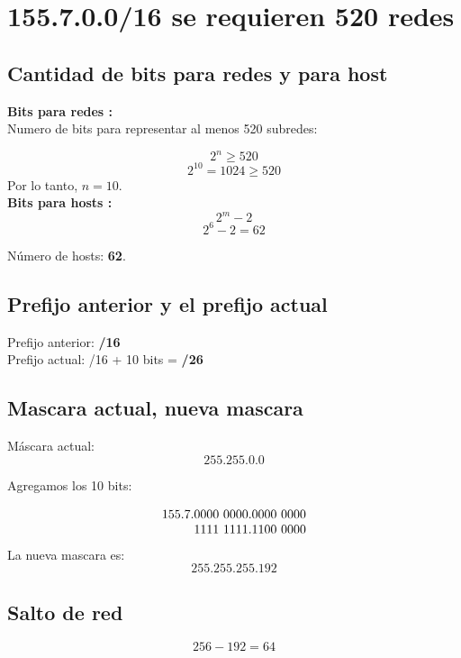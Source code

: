 \documentclass[letterpaper,12pt]{article}
\begin{document}
    \newpage

    \section{155.7.0.0/16 se requieren 520 redes}

    \subsection{Cantidad de bits para redes y para host}
    \textbf{Bits para redes :} \\
    
    Numero de bits   para representar al menos 520 subredes:
    
    \[2^n \geq 520\]
    \[2^{10} = 1024 \geq 520\]
    Por lo tanto, $n = 10$. \\

    \textbf{Bits para hosts :} \\

    \[ 2^m - 2  \]
    \[ 2^{6} - 2 = 62 \]

    Número de hosts: \textbf{62}.

    \subsection{Prefijo anterior y el prefijo actual}
    
    Prefijo anterior: \textbf{/16} \\
    Prefijo actual: /16 + 10 bits   = \textbf{/26}

    \subsection{Mascara actual, nueva mascara}
    Máscara actual:
    \[ 255.255.0.0 \]

    Agregamos los 10 bits:

    \[
    155.7.\begin{array}[t]{@{}c@{}}
    0000 \ 0000 .0000 \ 0000  \\
    1111 \ 1111 .1100 \ 0000
    \end{array}
    \]
    La nueva mascara es:
    \[ 255.255.255.192 \]

    \subsection{Salto de red}

    \[ 256 - 192 = 64 \]
\end{document}
